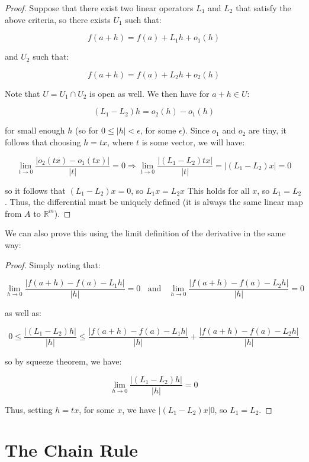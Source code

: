 \documentclass[10pt, oneside]{amsart}
\begin{document}
    \begin{proof}
      Suppose that there exist two linear operators $L_1$ and $L_2$ that satisfy the above criteria, so there exists $U_1$ such that:

      $$f(a + h) = f(a) + L_1 h + o_1(h)$$

      and $U_2$ such that:

      $$f(a + h) = f(a) + L_2 h + o_2(h)$$

      Note that $U = U_1 \cap U_2$ is open as well. We then have for $a + h \in U$:

      $$(L_1 - L_2) h = o_2(h) - o_1(h)$$

      for small enough $h$ (so for $0 \leq |h| < \epsilon$, for some $\epsilon$). Since $o_1$ and $o_2$ are tiny, it follows that choosing $h = tx$, where $t$ is some vector, we will have:

      $$\lim_{t \to 0} \frac{|o_2(tx) - o_1(tx)|}{|t|} = 0 \Rightarrow \lim_{t \to 0} \frac{|(L_1 - L_2) tx|}{|t|} = |(L_1 - L_2) x| = 0$$

      so it follows that $(L_1 - L_2) x = 0$, so $L_1 x = L_2 x$ This holds for all $x$, so $L_1 = L_2$. Thus, the differential must be uniquely defined (it is always the same linear map from $A$ to $\mathbb{R}^{m}$).
    \end{proof}

    We can also prove this using the limit definition of the derivative in the same way:

    \begin{proof}
    Simply noting that:

    $$\lim_{h \to 0} \frac{ |f(a + h) - f(a) - L_1 h|}{|h|} = 0 \ \ \ \ \text{and} \ \ \ \ \lim_{h \to 0} \frac{ |f(a + h) - f(a) - L_2 h|}{|h|} = 0$$

    as well as:

    $$0 \leq \frac{|(L_1 - L_2) h|}{|h|} \leq \frac{ |f(a + h) - f(a) - L_1 h|}{|h|} + \frac{ |f(a + h) - f(a) - L_2 h|}{|h|}$$

    so by squeeze theorem, we have:

    $$\lim_{h \to 0} \frac{|(L_1 - L_2) h|}{|h|} = 0$$

    Thus, setting $h = tx$, for some $x$, we have $|(L_1 - L_2) x| 0$, so $L_1 = L_2$.
    \end{proof}

    \section{The Chain Rule}
\end{document}
